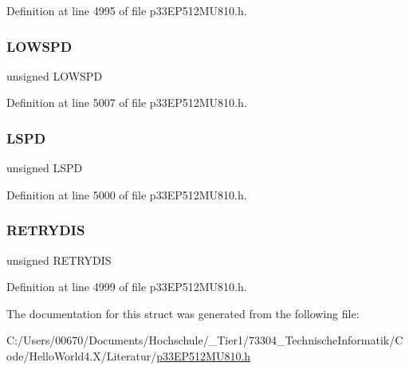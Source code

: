 Definition at line 4995 of file p33\+E\+P512\+M\+U810.\+h.

\mbox{\label{structtag_u1_e_p0_b_i_t_s_a4d04bf7869e6f4b348ab4492a62ce69a}} 
\subsubsection{\texorpdfstring{L\+O\+W\+S\+PD}{LOWSPD}}
{\footnotesize\ttfamily unsigned L\+O\+W\+S\+PD}



Definition at line 5007 of file p33\+E\+P512\+M\+U810.\+h.

\mbox{\label{structtag_u1_e_p0_b_i_t_s_a02f095ee7c2d2a9b5485940da3f8702a}} 
\subsubsection{\texorpdfstring{L\+S\+PD}{LSPD}}
{\footnotesize\ttfamily unsigned L\+S\+PD}



Definition at line 5000 of file p33\+E\+P512\+M\+U810.\+h.

\mbox{\label{structtag_u1_e_p0_b_i_t_s_a2d6c1715d6e66bbdc0898f60b4e641ba}} 
\subsubsection{\texorpdfstring{R\+E\+T\+R\+Y\+D\+IS}{RETRYDIS}}
{\footnotesize\ttfamily unsigned R\+E\+T\+R\+Y\+D\+IS}



Definition at line 4999 of file p33\+E\+P512\+M\+U810.\+h.



The documentation for this struct was generated from the following file\+:\begin{DoxyCompactItemize}
\item 
C\+:/\+Users/00670/\+Documents/\+Hochschule/\+\_\+\+Tier1/73304\+\_\+\+Technische\+Informatik/\+Code/\+Hello\+World4.\+X/\+Literatur/\hyperlink{p33_e_p512_m_u810_8h}{p33\+E\+P512\+M\+U810.\+h}\end{DoxyCompactItemize}
